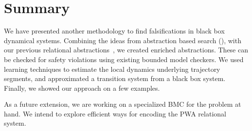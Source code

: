 

\section{Summary}%

We have presented another methodology to find falsifications in black
box dynamical systems. Combining the ideas from abstraction based
search (), with our previous relational
abstractions~\cite{zutshi2012timed}, we created enriched abstractions.
These can be checked for safety violations using existing bounded
model checkers.  We used learning techniques to estimate the local
dynamics underlying trajectory segments, and approximated a transition
system from a black box system. Finally, we showed our approach on a
few examples.

As a future extension, we are working on a specialized BMC for the
problem at hand. We intend to explore efficient ways for encoding the
PWA relational system.


%  
%  
%  


